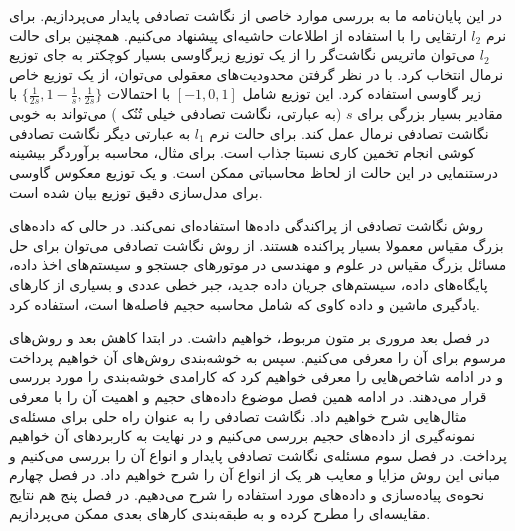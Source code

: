 در این پایان‌نامه ما به بررسی موارد خاصی از نگاشت تصادفی پایدار می‌پردازیم. برای نرم 
$l_2$
ارتقایی را با استفاده از اطلاعات حاشیه‌ای پیشنهاد می‌کنیم. همچنین برای حالت $l_2$ می‌توان ماتریس نگاشت‌گر را از یک توزیع زیرگاوسی%
بسیار کوچکتر به جای توزیع نرمال انتخاب کرد. با در نظر گرفتن محدودیت‌های معقولی می‌توان، از یک توزیع خاص زیر گاوسی استفاده کرد. این توزیع شامل 
$[-1,0,1]$
با احتمالات 
$\{ \frac{1}{2s}, 1-\frac{1}{s}, \frac{1}{2s} \}$
با مقادیر بسیار بزرگی برای 
‌‌‌$s$
(به عبارتی، نگاشت تصادفی خیلی تُنُک %
) می‌تواند به خوبی نگاشت تصادفی نرمال عمل کند. برای حالت نرم 
$l_1$
به عبارتی دیگر نگاشت تصادفی کوشی %
انجام تخمین کاری نسبتا جذاب است. برای مثال، محاسبه برآوردگر بیشینه درستنمایی 
در این حالت از لحاظ محاسباتی ممکن است. و یک توزیع معکوس گاوسی %
برای مدل‌سازی دقیق توزیع 
بیان شده است.

روش نگاشت تصادفی از پراکندگی داده‌ها استفاده‌ای نمی‌کند. در حالی که داده‌های بزرگ مقیاس معمولا بسیار پراکنده هستند. از روش نگاشت تصادفی می‌توان برای حل مسائل بزرگ مقیاس در علوم و مهندسی در موتورهای جستجو و سیستم‌های اخذ داده، پایگاه‌های داده، سیستم‌های جریان داده جدید، جبر خطی عددی و بسیاری از کارهای یادگیری ماشین و داده کاوی که شامل محاسبه حجیم فاصله‌ها است، استفاده کرد.

در فصل بعد مروری بر متون مربوط، خواهیم داشت. در ابتدا کاهش بعد و روش‌های مرسوم برای آن را معرفی می‌کنیم. سپس به خوشه‌بندی روش‌های آن خواهیم پرداخت و در ادامه شاخص‌هایی را معرفی خواهیم کرد که کارامدی خوشه‌بندی را مورد بررسی قرار می‌دهند. در ادامه همین فصل موضوع داده‌های حجیم و اهمیت آن را با معرفی مثال‌هایی شرح خواهیم داد. نگاشت تصادفی را به عنوان راه حلی برای مسئله‌ی نمونه‌گیری از داده‌های حجیم بررسی می‌کنیم و در نهایت به کاربردهای آن خواهیم پرداخت. در فصل سوم مسئله‌ی نگاشت تصادفی پایدار و انواع آن را بررسی می‌کنیم و مبانی این روش مزایا و معایب هر یک از انواع آن را شرح خواهیم داد. در فصل چهارم نحوه‌ی پیاده‌سازی و داده‌های مورد استفاده را شرح می‌دهیم. در فصل پنج هم نتایج مقایسه‌ای را مطرح کرده و به طبقه‌بندی کارهای بعدی ممکن می‌پردازیم.







